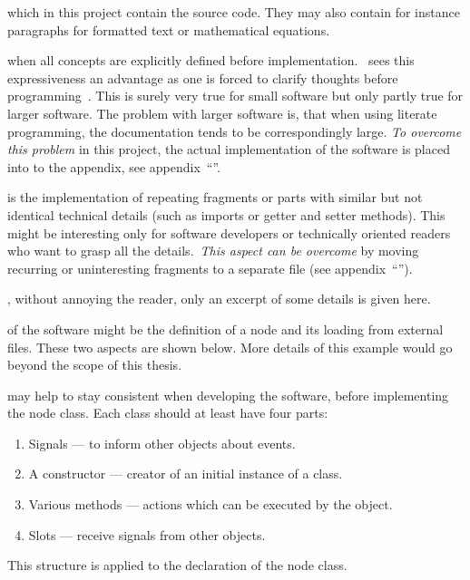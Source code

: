 \documentclass[%
    a4paper,    %
    justified,  %
    nobib,      %
    openany     %
]{tufte-book}
\begin{document}
 which in this project contain the
source code. They may also contain for instance paragraphs for formatted text or
mathematical equations.

 when all concepts are
explicitly defined before implementation.~ sees
this expressiveness an advantage as one is forced to clarify thoughts before
programming~\cite[p. 13]{knuth-lp-1984}. This is surely very true for small
software but only partly true for larger software. The problem with larger
software is, that when using literate programming, the documentation tends to be
correspondingly large. \emph{To overcome this problem} in this project, the
actual implementation of the software is placed into to the appendix,
see appendix~\enquote{}.

 is the implementation of repeating
fragments or parts with similar but not identical technical details (such as imports
or getter and setter methods). This might be interesting only for
software developers or technically oriented readers who want to grasp all the
details.~\emph{This aspect can
be overcome} by moving recurring or uninteresting fragments to a separate
file (see appendix~\enquote{}).

, without annoying
the reader, only an excerpt of some details is given here.

 of the software might be the
definition of a node and its loading from external files. These two aspects are
shown below. More details of this example would go beyond the scope of this
thesis.

 may help to stay
consistent when developing the software, before implementing the node class.
Each class should at least have four parts:
\begin{enumerate}
  \item Signals --- to inform other objects about events.
  \item A constructor --- creator of an initial instance of a class.
  \item Various methods --- actions which can be executed by the object.
  \item Slots --- receive signals from other objects.
\end{enumerate}
This structure is applied to the declaration of the node class.
\end{document}
